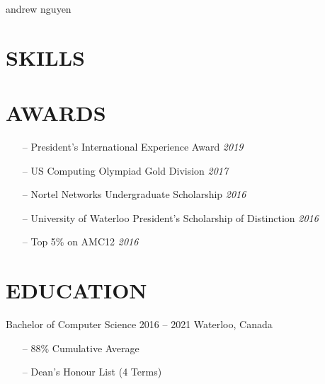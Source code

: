 \documentclass{aanguyen_res}
\begin{document}
  \header%
    {andrew}%
    {nguyen}%
    {}%
    {}%
  \begin{sidebar}
    \section{SKILLS}
    \section{AWARDS}
      \begin{itemize}[leftmargin=0.45cm, topsep=0.0cm]%
        \item[--] President's International Experience Award \separator\emph{2019}
        \item[--] US Computing Olympiad Gold Division \separator\emph{2017}
        \item[--] Nortel Networks Undergraduate Scholarship \separator\emph{2016}
        \item[--] University of Waterloo President's Scholarship of Distinction \separator\emph{2016}
        \item[--] Top 5\% on AMC12  \separator\emph{2016}
      \end{itemize}%
    \section{EDUCATION}
      \color{tagText}Bachelor of Computer Science
      \color{subTagText}2016 -- 2021 \separator\color{subTagText}Waterloo, Canada
      \color{bodyText}%
      \begin{itemize}[leftmargin=0.45cm, noitemsep, topsep=0.0cm]%
        \item[--] 88\% Cumulative Average
        \item[--] Dean's Honour List (4 Terms)
      \end{itemize}%

\end{sidebar}
\end{document}
